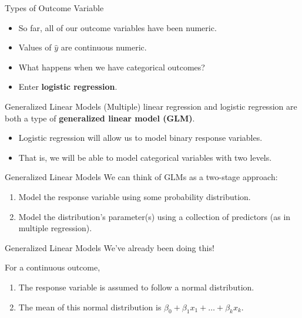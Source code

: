\begin{frame}{Types of Outcome Variable}
    \begin{itemize}
        \item So far, all of our outcome variables have been numeric.
        \item Values of $\hat{y}$ are continuous numeric.
        \item What happens when we have categorical outcomes?
        \item Enter \textbf{logistic regression}.
    \end{itemize}
\end{frame}

\begin{frame}{Generalized Linear Models}
    (Multiple) linear regression and logistic regression are both a type of \textbf{generalized linear model (GLM)}.
    \begin{itemize}
        \item Logistic regression will allow us to model binary response variables.
        \item That is, we will be able to model categorical variables with two levels.
    \end{itemize}
\end{frame}

\begin{frame}{Generalized Linear Models}
    We can think of GLMs as a two-stage approach:
    \begin{enumerate}
        \item Model the response variable using some probability distribution.
        \item Model the distribution's parameter(s) using a collection of predictors (as in multiple regression).
    \end{enumerate}
\end{frame}

\begin{frame}{Generalized Linear Models}
    We've already been doing this! 
    
    \vspace{12pt}For a continuous outcome,
    \begin{enumerate}
        \item The response variable is assumed to follow a normal distribution.
        \item The mean of this normal distribution is $\beta_0 + \beta_1x_1 + \dots + \beta_kx_k$.
    \end{enumerate}
\end{frame}

